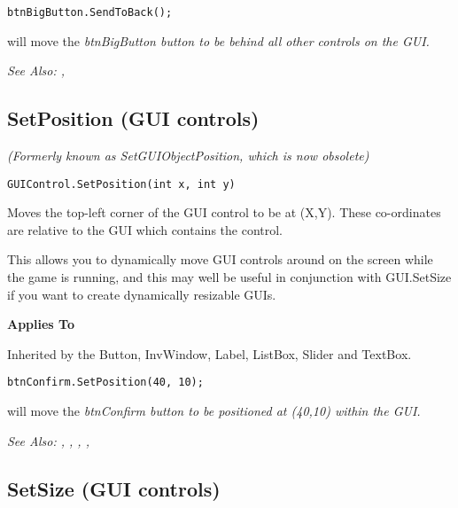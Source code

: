 \begin{verbatim}
btnBigButton.SendToBack();
\end{verbatim}
will move the \it{btnBigButton} button to be behind all other controls on the GUI.

\it{See Also:}
,


\subsection{SetPosition (GUI controls)}\label{GUIControl.SetPosition}%

\it{(Formerly known as SetGUIObjectPosition, which is now obsolete)}

\begin{verbatim}
GUIControl.SetPosition(int x, int y)
\end{verbatim}
Moves the top-left corner of the GUI control to be at (X,Y). These co-ordinates
are relative to the GUI which contains the control.

This allows you to dynamically move GUI controls around on the screen while the
game is running, and this may well be useful in conjunction with GUI.SetSize if you
want to create dynamically resizable GUIs.

\bf{Applies To}

Inherited by the Button, InvWindow, Label, ListBox, Slider and TextBox.

\begin{verbatim}
btnConfirm.SetPosition(40, 10);
\end{verbatim}
will move the \it{btnConfirm} button to be positioned at (40,10) within the GUI.

\it{See Also:} ,
, ,
, 


\subsection{SetSize (GUI controls)}\label{GUIControl.SetSize}%

